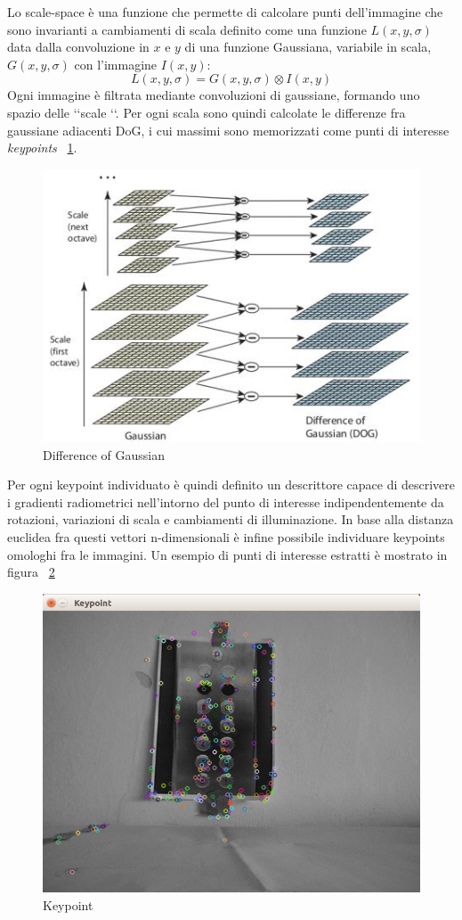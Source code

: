 Lo scale-space è una funzione che permette di calcolare punti dell’immagine che sono invarianti a cambiamenti di scala definito come una funzione $L(x,y,\sigma)$ data dalla convoluzione in $x$ e $y$ di una funzione Gaussiana, variabile in scala, $G(x,y,\sigma)$ con l’immagine $I(x,y)$:
\begin{equation}
L(x,y,\sigma) =  G(x,y,\sigma) \otimes I(x,y)
\label{eq:surface_modeling}
\end{equation}
Ogni immagine è filtrata mediante convoluzioni di gaussiane, formando uno spazio delle \lq \lq scale \lq \lq. Per ogni scala sono quindi calcolate le differenze fra gaussiane adiacenti DoG, i cui massimi sono memorizzati come punti di interesse \emph{keypoints} ~\ref{fig:scale_gaussian}.
\begin{figure}[H]
   \centering
   \includegraphics[width=.7\columnwidth]{sift.jpg}
   \caption{Difference of Gaussian}
   \label{fig:scale_gaussian} 
\end{figure}
Per ogni keypoint individuato è quindi definito un descrittore capace di descrivere i gradienti radiometrici nell’intorno del punto di interesse indipendentemente da rotazioni, variazioni di scala e cambiamenti di illuminazione. In base alla distanza euclidea fra questi vettori n-dimensionali è infine possibile individuare keypoints omologhi fra le immagini. Un esempio di punti di interesse estratti è mostrato in figura ~\ref{fig:keypoint}
\begin{figure}[H]
   \centering
   \includegraphics[width=1.\columnwidth]{keypoint.png}
   \caption{Keypoint}
   \label{fig:keypoint} 
\end{figure}
